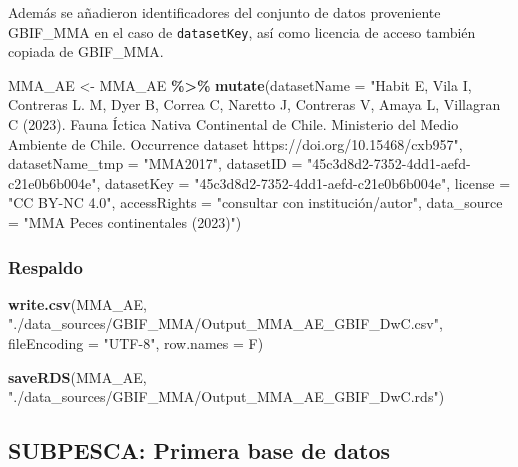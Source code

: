 \documentclass[sn-apa,pdflatex]{sn-jnl}
\newenvironment{Shaded}{\begin{snugshade}}{\end{snugshade}}
\newcommand{\AttributeTok}[1]{\textcolor[rgb]{0.13,0.29,0.53}{#1}}
\newcommand{\FunctionTok}[1]{\textcolor[rgb]{0.13,0.29,0.53}{\textbf{#1}}}
\newcommand{\NormalTok}[1]{#1}
\newcommand{\OtherTok}[1]{\textcolor[rgb]{0.56,0.35,0.01}{#1}}
\newcommand{\SpecialCharTok}[1]{\textcolor[rgb]{0.81,0.36,0.00}{\textbf{#1}}}
\newcommand{\StringTok}[1]{\textcolor[rgb]{0.31,0.60,0.02}{#1}}
\begin{document}
Además se añadieron identificadores del conjunto de datos proveniente
GBIF\_MMA en el caso de \texttt{datasetKey}, así como licencia de acceso
también copiada de GBIF\_MMA.

\begin{Shaded}
\begin{Highlighting}[]
\NormalTok{MMA\_AE }\OtherTok{\textless{}{-}}\NormalTok{ MMA\_AE }\SpecialCharTok{\%\textgreater{}\%}
    \FunctionTok{mutate}\NormalTok{(}\AttributeTok{datasetName =} \StringTok{"Habit E, Vila I, Contreras L. M, Dyer B, Correa C, Naretto J, Contreras V, Amaya L, Villagran C (2023). Fauna Íctica Nativa Continental de Chile. Ministerio del Medio Ambiente de Chile. Occurrence dataset https://doi.org/10.15468/cxb957"}\NormalTok{,}
        \AttributeTok{datasetName\_tmp =} \StringTok{"MMA2017"}\NormalTok{, }\AttributeTok{datasetID =} \StringTok{"45c3d8d2{-}7352{-}4dd1{-}aefd{-}c21e0b6b004e"}\NormalTok{,}
        \AttributeTok{datasetKey =} \StringTok{"45c3d8d2{-}7352{-}4dd1{-}aefd{-}c21e0b6b004e"}\NormalTok{,}
        \AttributeTok{license =} \StringTok{"CC BY{-}NC 4.0"}\NormalTok{, }\AttributeTok{accessRights =} \StringTok{"consultar con institución/autor"}\NormalTok{,}
        \AttributeTok{data\_source =} \StringTok{"MMA Peces continentales (2023)"}\NormalTok{)}
\end{Highlighting}
\end{Shaded}

\subsubsection{Respaldo}\label{respaldo-3}

\begin{Shaded}
\begin{Highlighting}[]
\FunctionTok{write.csv}\NormalTok{(MMA\_AE, }\StringTok{"./data\_sources/GBIF\_MMA/Output\_MMA\_AE\_GBIF\_DwC.csv"}\NormalTok{,}
    \AttributeTok{fileEncoding =} \StringTok{"UTF{-}8"}\NormalTok{, }\AttributeTok{row.names =}\NormalTok{ F)}

\FunctionTok{saveRDS}\NormalTok{(MMA\_AE, }\StringTok{"./data\_sources/GBIF\_MMA/Output\_MMA\_AE\_GBIF\_DwC.rds"}\NormalTok{)}
\end{Highlighting}
\end{Shaded}

\subsection{SUBPESCA: Primera base de
datos}\label{subpesca-primera-base-de-datos}
\end{document}
